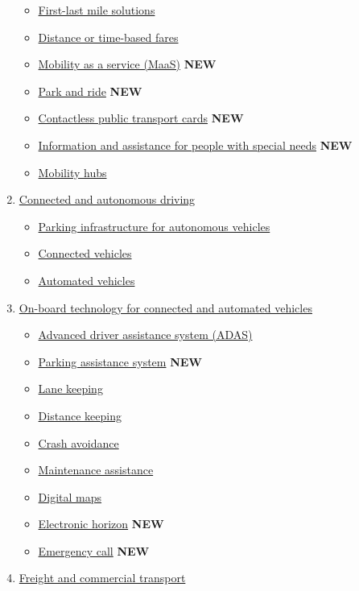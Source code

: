 \documentclass[
]{book}
\providecommand{\tightlist}{%
  \setlength{\itemsep}{0pt}\setlength{\parskip}{0pt}}
\begin{document}
\begin{enumerate}
  \begin{itemize}
  \tightlist
  \item
    \protect\hyperlink{flms}{First-last mile solutions}
  \item
    \protect\hyperlink{dist_time_fares}{Distance or time-based fares}
  \item
    \protect\hyperlink{maas}{Mobility as a service (MaaS)} \textbf{NEW}
  \item
    \protect\hyperlink{p_r}{Park and ride} \textbf{NEW}
  \item
    \protect\hyperlink{contactless_cards}{Contactless public transport cards} \textbf{NEW}
  \item
    \protect\hyperlink{special_needs}{Information and assistance for people with special needs} \textbf{NEW}
  \item
    \protect\hyperlink{mobility_hubs}{Mobility hubs}
  \end{itemize}
\item
  \protect\hyperlink{connected}{Connected and autonomous driving}

  \begin{itemize}
  \tightlist
  \item
    \protect\hyperlink{parking_av}{Parking infrastructure for autonomous vehicles}
  \item
    \protect\hyperlink{connected_veh}{Connected vehicles}
  \item
    \protect\hyperlink{av}{Automated vehicles}
  \end{itemize}
\item
  \protect\hyperlink{onboard}{On-board technology for connected and automated vehicles}

  \begin{itemize}
  \tightlist
  \item
    \protect\hyperlink{adas}{Advanced driver assistance system (ADAS)}
  \item
    \protect\hyperlink{parking_assistance}{Parking assistance system} \textbf{NEW}
  \item
    \protect\hyperlink{lane_keeping}{Lane keeping}
  \item
    \protect\hyperlink{distance_keeping}{Distance keeping}
  \item
    \protect\hyperlink{crash_avoid}{Crash avoidance}
  \item
    \protect\hyperlink{maintenance_assis}{Maintenance assistance}
  \item
    \protect\hyperlink{digital_maps}{Digital maps}
  \item
    \protect\hyperlink{ehorizon}{Electronic horizon} \textbf{NEW}
  \item
    \protect\hyperlink{ecall}{Emergency call} \textbf{NEW}
  \end{itemize}
\item
  \protect\hyperlink{freight}{Freight and commercial transport}


\end{enumerate}
\end{document}
